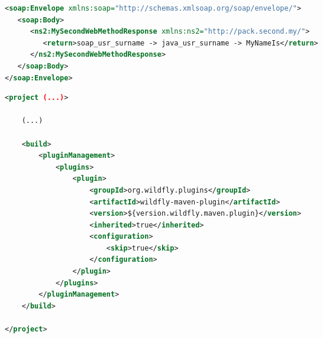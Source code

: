 \documentclass[aspectratio=1610,english]{beamer} %
\begin{document}
	\begin{lrbox}{\secondProjectSoapAnswerBox}
		\begin{varwidth}{0.28\textwidth}
			\fontsize{3}{5} \selectfont
				\begin{lstlisting}[style=myCustomStyle, language=XML,
  					morekeywords={soap, ns2,
    				xs:schema, 
    				xs:element, 
    				xs:complexType, 
    				xs:sequence, 
    				xs:attribute},
    				basicstyle=\ttfamily,
					columns=fullflexible,
					showstringspaces=false,
					commentstyle=\color{gray}\upshape, 
					belowskip=-20pt,
					aboveskip=0pt ]
<soap:Envelope xmlns:soap="http://schemas.xmlsoap.org/soap/envelope/">
   <soap:Body>
      <ns2:MySecondWebMethodResponse xmlns:ns2="http://pack.second.my/">
         <return>soap_usr_surname -> java_usr_surname -> MyNameIs</return>
      </ns2:MySecondWebMethodResponse>
   </soap:Body>
</soap:Envelope>							\end{lstlisting}
		\end{varwidth}
	\end{lrbox}
	
	\begin{lrbox}{\secondProjectPomBox}
		\begin{varwidth}{0.28\textwidth}
			\fontsize{3}{5} \selectfont
				\begin{lstlisting}[style=myCustomStyle, language=XML,
  					morekeywords={soap, ns2,
    				xs:schema, 
    				xs:element, 
    				xs:complexType, 
    				xs:sequence, 
    				xs:attribute},
    				basicstyle=\ttfamily,
					columns=fullflexible,
					showstringspaces=false,
					commentstyle=\color{gray}\upshape, 
					belowskip=-20pt,
					aboveskip=0pt ]
<project (...)>

	(...)
	
    <build>
        <pluginManagement>
            <plugins>
                <plugin>
                    <groupId>org.wildfly.plugins</groupId>
                    <artifactId>wildfly-maven-plugin</artifactId>
                    <version>${version.wildfly.maven.plugin}</version>
                    <inherited>true</inherited>
                    <configuration>
                        <skip>true</skip>
                    </configuration>
                </plugin>
            </plugins>
        </pluginManagement>
    </build>

</project>							\end{lstlisting}
		\end{varwidth}
	\end{lrbox}
	
\end{document}
